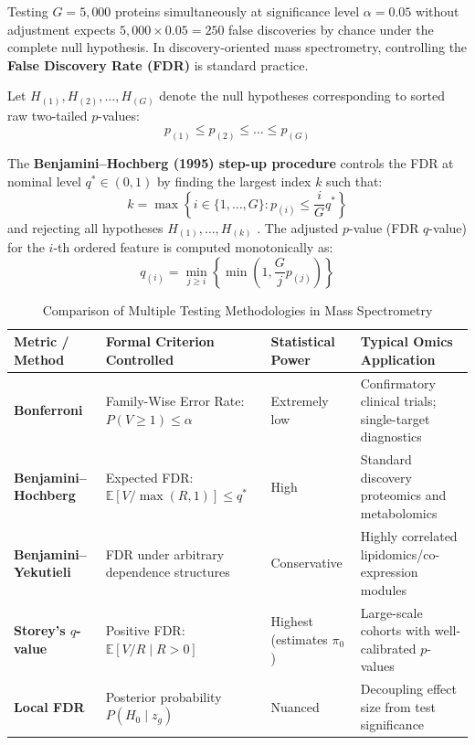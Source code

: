 \documentclass[11pt,twoside,openright]{book}
\begin{document}
Testing $G = 5,000$ proteins simultaneously at significance level $\alpha = 0.05$ without adjustment expects $5,000 \times 0.05 = 250$ false discoveries by chance under the complete null hypothesis. In discovery-oriented mass spectrometry, controlling the \textbf{False Discovery Rate (FDR)} is standard practice.

Let $H_{(1)}, H_{(2)}, \dots, H_{(G)}$ denote the null hypotheses corresponding to sorted raw two-tailed $p$-values:
\begin{equation}
p_{(1)} \le p_{(2)} \le \dots \le p_{(G)}
\end{equation}

\noindent
The \textbf{Benjamini--Hochberg (1995) step-up procedure} controls the FDR at nominal level $q^* \in (0, 1)$ by finding the largest index $k$ such that:
\begin{equation}
k = \max \left\{ i \in \{1, \dots, G\} : p_{(i)} \le \frac{i}{G} q^* \right\}
\label{eq:bh_procedure}
\end{equation}
and rejecting all hypotheses $H_{(1)}, \dots, H_{(k)}$ \cite{benjamini1995controlling}. The adjusted $p$-value (FDR $q$-value) for the $i$-th ordered feature is computed monotonically as:
\begin{equation}
q_{(i)} = \min_{j \ge i} \left\{ \min\left(1, \frac{G}{j} p_{(j)}\right) \right\}
\label{eq:bh_adjusted_p}
\end{equation}

\begin{table}[ht]
\centering
\caption{Comparison of Multiple Testing Methodologies in Mass Spectrometry}
\label{tab:fdr_comparison}
\small
\begin{tabularx}{\textwidth}{lXXX}
\toprule
\textbf{Metric / Method} & \textbf{Formal Criterion Controlled} & \textbf{Statistical Power} & \textbf{Typical Omics Application} \\
\midrule
\textbf{Bonferroni} & Family-Wise Error Rate: $P(V \ge 1) \le \alpha$ & Extremely low & Confirmatory clinical trials; single-target diagnostics \\
\textbf{Benjamini--Hochberg} \cite{benjamini1995controlling} & Expected FDR: $\mathbb{E}[V / \max(R, 1)] \le q^*$ & High & Standard discovery proteomics and metabolomics \\
\textbf{Benjamini--Yekutieli} \cite{benjamini2001control} & FDR under arbitrary dependence structures & Conservative & Highly correlated lipidomics/co-expression modules \\
\textbf{Storey's $q$-value} \cite{storey2003statistical} & Positive FDR: $\mathbb{E}[V / R \mid R > 0]$ & Highest (estimates $\pi_0$) & Large-scale cohorts with well-calibrated $p$-values \\
\textbf{Local FDR} \cite{efron2004large} & Posterior probability $P(H_0 \mid z_g)$ & Nuanced & Decoupling effect size from test significance \\
\bottomrule
\end{tabularx}
\end{table}
\end{document}

